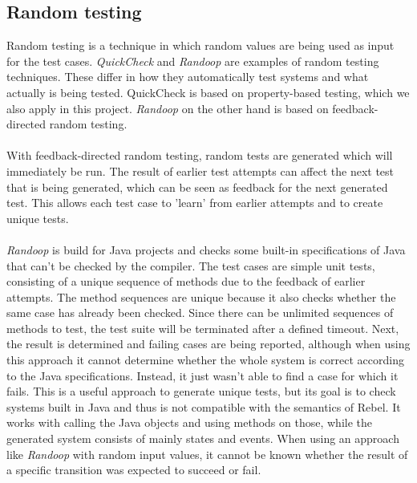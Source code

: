 \subsection{Random testing}
Random testing is a technique in which random values are being used as input for the test cases. \textit{QuickCheck} \cite{claessen2011quickcheck} and \textit{Randoop} \cite{pacheco2007randoop} are examples of random testing techniques. These differ in how they automatically test systems and what actually is being tested. QuickCheck is based on property-based testing, which we also apply in this project. \textit{Randoop} on the other hand is based on feedback-directed random testing.\\
\\
With feedback-directed random testing, random tests are generated which will immediately be run. The result of earlier test attempts can affect the next test that is being generated, which can be seen as feedback for the next generated test. This allows each test case to 'learn' from earlier attempts and to create unique tests.\\
\\
\textit{Randoop} is build for Java projects and checks some built-in specifications of Java that can't be checked by the compiler. The test cases are simple unit tests, consisting of a unique sequence of methods due to the feedback of earlier attempts. The method sequences are unique because it also checks whether the same case has already been checked. Since there can be unlimited sequences of methods to test, the test suite will be terminated after a defined timeout. Next, the result is determined and failing cases are being reported, although when using this approach it cannot determine whether the whole system is correct according to the Java specifications. Instead, it just wasn't able to find a case for which it fails. This is a useful approach to generate unique tests, but its goal is to check systems built in Java and thus is not compatible with the semantics of Rebel. It works with calling the Java objects and using methods on those, while the generated system consists of mainly states and events. When using an approach like \textit{Randoop} with random input values, it cannot be known whether the result of a specific transition was expected to succeed or fail.\\
\\

